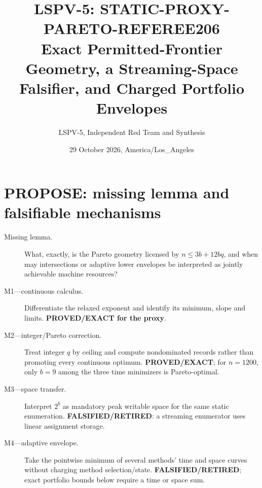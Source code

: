 \documentclass[11pt]{article}
\title{LSPV-5: STATIC-PROXY-PARETO-REFEREE206\\[2pt]
\large Exact Permitted-Frontier Geometry, a Streaming-Space Falsifier, and Charged Portfolio Envelopes}
\author{LSPV-5, Independent Red Team and Synthesis}
\date{29 October 2026, America/Los\_Angeles}
\begin{document}
\maketitle

\begin{center}
\end{center}

\section{PROPOSE: missing lemma and falsifiable mechanisms}
\begin{description}
\item[Missing lemma.] What, exactly, is the Pareto geometry licensed by
$n\le3b+12bq$, and when may intersections or adaptive lower envelopes be
interpreted as jointly achievable machine resources?
\item[M1---continuous calculus.] Differentiate the relaxed exponent and
identify its minimum, slope and limits.  \textbf{PROVED/EXACT for the proxy}.
\item[M2---integer/Pareto correction.] Treat integer $q$ by ceiling and
compute nondominated records rather than promoting every continuous optimum.
\textbf{PROVED/EXACT}; for $n=1200$, only $b=9$ among the three time
minimizers is Pareto-optimal.
\item[M3---space transfer.] Interpret $2^b$ as mandatory peak writable space
for the same static enumeration.  \textbf{FALSIFIED/RETIRED}: a streaming
enumerator uses linear assignment storage.
\item[M4---adaptive envelope.] Take the pointwise minimum of several methods'
time and space curves without charging method selection/state.  \textbf{FALSIFIED/RETIRED}; exact portfolio bounds below require a time or space sum.
\end{description}
\end{document}
